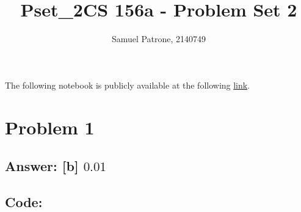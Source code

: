 \documentclass[11pt]{article}
\title{Pset\_2}
\begin{document}
    \title{CS 156a - Problem Set 2}
    \author{Samuel Patrone, 2140749}
    \maketitle
    

The following notebook is publicly available at the following
\href{https://github.com/spatrone/CS156A-Caltech.git}{link}.

\tableofcontents

    \hypertarget{problem-1}{%
\section{Problem 1}\label{problem-1}}

\hypertarget{answer-b-0.01}{%
\subsection{\texorpdfstring{Answer: {[}b{]}
\(0.01\)}{Answer: {[}b{]} 0.01}}\label{answer-b-0.01}}

\hypertarget{code}{%
\subsection{Code:}\label{code}}
\end{document}
